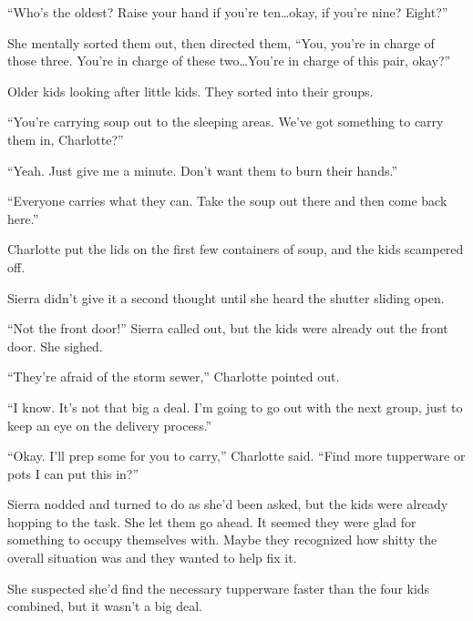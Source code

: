 ``Who's the oldest?  Raise your hand if you're ten\ldots okay, if you're nine?  Eight?''



She mentally sorted them out, then directed them, ``You, you're in charge of those three.  You're in charge of these two\ldots You're in charge of this pair, okay?''



Older kids looking after little kids.  They sorted into their groups.



``You're carrying soup out to the sleeping areas.  We've got something to carry them in, Charlotte?''



``Yeah.  Just give me a minute.  Don't want them to burn their hands.''



``Everyone carries what they can.  Take the soup out there and then come back here.''



Charlotte put the lids on the first few containers of soup, and the kids scampered off.



Sierra didn't give it a second thought until she heard the shutter sliding open.



``Not the front door!''  Sierra called out, but the kids were already out the front door.  She sighed.



``They're afraid of the storm sewer,'' Charlotte pointed out.



``I know.  It's not that big a deal.  I'm going to go out with the next group, just to keep an eye on the delivery process.''



``Okay.  I'll prep some for you to carry,'' Charlotte said.  ``Find more tupperware or pots I can put this in?''



Sierra nodded and turned to do as she'd been asked, but the kids were already hopping to the task.  She let them go ahead.  It seemed they were glad for something to occupy themselves with.  Maybe they recognized how shitty the overall situation was and they wanted to help fix it.



She suspected she'd find the necessary tupperware faster than the four kids combined, but it wasn't a big deal.



